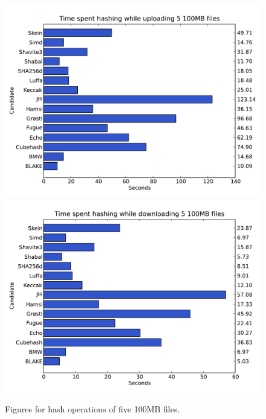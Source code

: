 \documentclass[english,12pt,a4paper]{book}
\begin{document}
\begin{figure}[h!]
    \centering
    \includegraphics[width=0.9\columnwidth]
        {graphs/Timespenthashingwhileuploading5100MBfiles.pdf}
    \includegraphics[width=0.9\columnwidth]
        {graphs/Timespenthashingwhiledownloading5100MBfiles.pdf}
    \caption{Figures for hash operations of five 100MB files.}
    \label{fig:graph:5100mb}
\end{figure}
\end{document}
